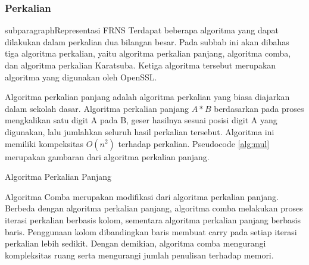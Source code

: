     \subsubsection{Perkalian} \label{sec:mul_theory}

      subparagraph{Representasi FRNS}
      Terdapat beberapa algoritma yang dapat dilakukan dalam perkalian dua bilangan besar. Pada subbab ini akan dibahas tiga algoritma perkalian, yaitu algoritma perkalian panjang, algoritma comba, dan algoritma perkalian Karatsuba. Ketiga algoritma tersebut merupakan algoritma yang digunakan oleh OpenSSL.

      Algoritma perkalian panjang adalah algoritma perkalian yang biasa diajarkan dalam sekolah dasar. Algoritma perkalian panjang $A*B$ berdasarkan pada proses mengkalikan satu digit A pada B, geser hasilnya sesuai posisi digit A yang digunakan, lalu jumlahkan seluruh hasil perkalian tersebut. Algoritma ini memiliki kompeksitas $O(n^2)$ terhadap perkalian. Pseudocode \ref{alg:mul} merupakan gambaran dari algoritma perkalian panjang.

      \begin{algorithm}
        \caption{Algoritma Perkalian Panjang}
        \label{alg:mul}
        \begin{algorithmic}[1]
          \Statex
          \EndFor
          \EndFor
          \State {}
          \EndFunction
        \end{algorithmic}
      \end{algorithm}

      Algoritma Comba merupakan modifikasi dari algoritma perkalian panjang. Berbeda dengan algoritma perkalian panjang, algoritma comba melakukan proses iterasi perkalian berbasis kolom, sementara algoritma perkalian panjang berbasis baris. Penggunaan kolom dibandingkan baris membuat carry pada setiap iterasi perkalian lebih sedikit. Dengan demikian, algoritma comba mengurangi kompleksitas ruang serta mengurangi jumlah penulisan terhadap memori.

